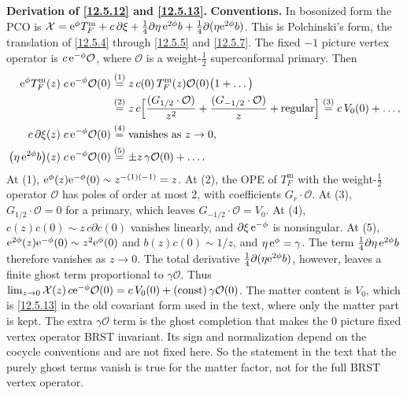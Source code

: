 \begin{tcolorbox}[breakable]
	\begin{remark}
		\textbf{Derivation of \eqref{12.5.12} and \eqref{12.5.13}.} \textbf{Conventions.} In bosonized form the PCO is $\mathcal X=\mathrm{e}^{\phi}T_{F}^{\mathrm m}+c\,\partial\xi+\frac14\partial\eta\,\mathrm{e}^{2\phi}b+\frac14\partial(\eta\mathrm{e}^{2\phi}b)$. This is Polchinski's form, the translation of \eqref{12.5.4} through \eqref{12.5.5} and \eqref{12.5.7}. The fixed $-1$ picture vertex operator is $c\,\mathrm{e}^{-\phi}\mathcal O$, where $\mathcal O$ is a weight-$\frac12$ superconformal primary. Then
		\begin{align*}
			\mathrm{e}^{\phi}T_{F}^{\mathrm m}(z)\;c\,\mathrm{e}^{-\phi}\mathcal O(0)
			&\overset{(1)}{=} z\,c(0)\,T_{F}^{\mathrm m}(z)\mathcal O(0)\bigl(1+\dots\bigr)\\
			&\overset{(2)}{=} z\,c\Bigl[\frac{(G_{1/2}\cdot\mathcal O)}{z^{2}}+\frac{(G_{-1/2}\cdot\mathcal O)}{z}+\text{regular}\Bigr]
			\overset{(3)}{=} c\,V_{0}(0)+\dots ,\\
			c\,\partial\xi(z)\;c\,\mathrm{e}^{-\phi}\mathcal O(0)&\overset{(4)}{=} \text{vanishes as } z\to0 ,\\
			\bigl(\eta\,\mathrm{e}^{2\phi}b\bigr)(z)\;c\,\mathrm{e}^{-\phi}\mathcal O(0)&\overset{(5)}{=} \pm z\,\gamma\mathcal O(0)+\dots .
		\end{align*}
		At (1), $\mathrm{e}^{\phi}(z)\mathrm{e}^{-\phi}(0)\sim z^{-(1)(-1)}=z$. At (2), the OPE of $T_{F}^{\mathrm m}$ with the weight-$\frac12$ operator $\mathcal O$ has poles of order at most $2$, with coefficients $G_{r}\cdot\mathcal O$. At (3), $G_{1/2}\cdot\mathcal O=0$ for a primary, which leaves $G_{-1/2}\cdot\mathcal O=V_{0}$. At (4), $c(z)c(0)\sim z\,c\partial c(0)$ vanishes linearly, and $\partial\xi\,\mathrm{e}^{-\phi}$ is nonsingular. At (5), $\mathrm{e}^{2\phi}(z)\mathrm{e}^{-\phi}(0)\sim z^{2}\mathrm{e}^{\phi}(0)$ and $b(z)c(0)\sim1/z$, and $\eta\,\mathrm{e}^{\phi}=\gamma$. The term $\frac14\partial\eta\,\mathrm{e}^{2\phi}b$ therefore vanishes as $z\to0$. The total derivative $\frac14\partial(\eta\mathrm{e}^{2\phi}b)$, however, leaves a finite ghost term proportional to $\gamma\mathcal O$. Thus $\lim_{z\to0}\mathcal X(z)\,c\mathrm{e}^{-\phi}\mathcal O(0)=c\,V_{0}(0)+(\text{const})\,\gamma\mathcal O(0)$. The matter content is $V_{0}$, which is \eqref{12.5.13} in the old covariant form used in the text, where only the matter part is kept. The extra $\gamma\mathcal O$ term is the ghost completion that makes the $0$ picture fixed vertex operator BRST invariant. Its sign and normalization depend on the cocycle conventions and are not fixed here. So the statement in the text that the purely ghost terms vanish is true for the matter factor, not for the full BRST vertex operator.
	\end{remark}
\end{tcolorbox}

